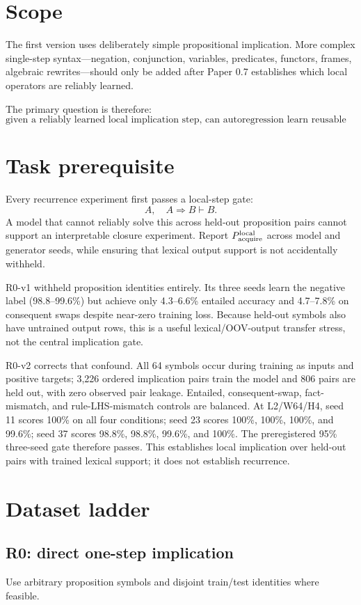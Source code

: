 \documentclass[10pt]{article}
\begin{document}
\section{Scope}
The first version uses deliberately simple propositional implication. More complex single-step syntax---negation, conjunction, variables, predicates, functors, frames, algebraic rewrites---should only be added after Paper 0.7 establishes which local operators are reliably learned.

The primary question is therefore:
\[
\boxed{\text{given a reliably learned local implication step, can autoregression learn reusable proof recurrence?}}
\]

\section{Task prerequisite}
Every recurrence experiment first passes a local-step gate:
\[
A,\quad A\Rightarrow B\vdash B.
\]
A model that cannot reliably solve this across held-out proposition pairs cannot support an interpretable closure experiment. Report $P_{\rm acquire}^{\rm local}$ across model and generator seeds, while ensuring that lexical output support is not accidentally withheld.

R0-v1 withheld proposition identities entirely. Its three seeds learn the negative label (98.8--99.6\%) but achieve only 4.3--6.6\% entailed accuracy and 4.7--7.8\% on consequent swaps despite near-zero training loss. Because held-out symbols also have untrained output rows, this is a useful lexical/OOV-output transfer stress, not the central implication gate.

R0-v2 corrects that confound. All 64 symbols occur during training as inputs and positive targets; 3,226 ordered implication pairs train the model and 806 pairs are held out, with zero observed pair leakage. Entailed, consequent-swap, fact-mismatch, and rule-LHS-mismatch controls are balanced. At L2/W64/H4, seed 11 scores 100\% on all four conditions; seed 23 scores 100\%, 100\%, 100\%, and 99.6\%; seed 37 scores 98.8\%, 98.8\%, 99.6\%, and 100\%. The preregistered 95\% three-seed gate therefore passes. This establishes local implication over held-out pairs with trained lexical support; it does not establish recurrence.

\section{Dataset ladder}
\subsection{R0: direct one-step implication}
Use arbitrary proposition symbols and disjoint train/test identities where feasible.
\end{document}
